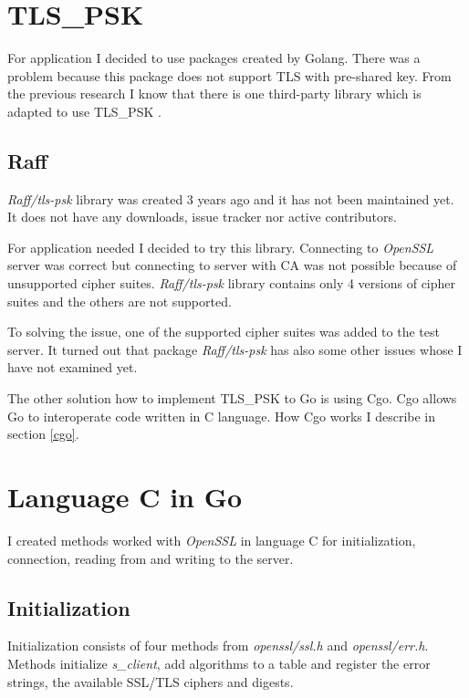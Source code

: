 \documentclass[
  oneside, 12pt, 
  printed, %
  notable,   %
  nolof,     %
  nolot,     %
]{fithesis3}
\begin{document}
\section{TLS\_PSK}
For application I decided to use packages created by Golang. There was a problem 
because this package does not support TLS with pre-shared key. From the previous 
research I know that there is one third-party library which is adapted to use TLS\_PSK 
\cite{raff}. 

\subsection{Raff}\label{raff}
\textit{Raff/tls-psk} library was created 3 years ago and it has not been maintained yet. It does 
not have any downloads, issue tracker nor active contributors. 

For application needed I decided to try this library. Connecting to \textit{OpenSSL} server was 
correct but connecting to server with CA was not possible because of unsupported cipher 
suites. \textit{Raff/tls-psk} library contains only 4 versions of cipher suites and the others 
are not supported. 

To solving the issue, one of the supported cipher suites was added to the test server. It turned 
out that package \textit{Raff/tls-psk} has also some other issues whose I have not examined yet.

The other solution how to implement TLS\_PSK to Go is using Cgo. Cgo allows Go to 
interoperate code written in C language. How Cgo works I describe in section \ref{cgo}. 


\section{Language C in Go}\label{langCinGo}
I created methods worked with \textit{OpenSSL} in language C for initialization, connection, 
reading from and writing to the server.

\subsection{Initialization}
Initialization consists of four methods from \textit{openssl/ssl.h} and \textit{openssl/err.h}. 
Methods initialize \textit{s\_client}, add algorithms to a table and register the error strings, 
the available SSL/TLS ciphers and digests.
\end{document}
